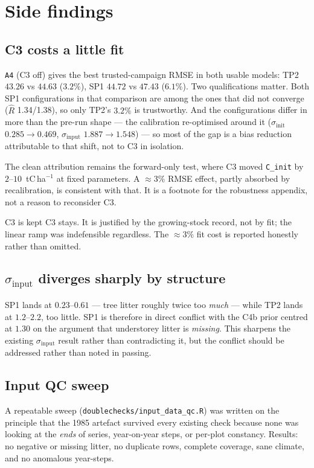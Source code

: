 \documentclass[11pt]{article}
\newcommand{\sinit}{\sigma_{\mathrm{init}}}
\newcommand{\sinput}{\sigma_{\mathrm{input}}}
\begin{document}
\section{Side findings}

\subsection{C3 costs a little fit}
\texttt{A4} (C3 off) gives the best trusted-campaign RMSE in both usable models: TP2 $43.26$ vs
$44.63$ ($3.2\%$), SP1 $44.72$ vs $47.43$ ($6.1\%$). Two qualifications matter. Both SP1
configurations in that comparison are among the ones that did not converge
($\hat{R}$ 1.34/1.38), so only TP2's $3.2\%$ is trustworthy. And the configurations differ in
more than the pre-run shape --- the calibration re-optimised around it ($\sinit$ $0.285
\rightarrow 0.469$, $\sinput$ $1.887 \rightarrow 1.548$) --- so most of the gap is a bias
reduction attributable to that shift, not to C3 in isolation.

The clean attribution remains the forward-only test, where C3 moved \texttt{C\_init} by
$2$--$10$~tC\,ha$^{-1}$ at fixed parameters. A $\approx 3\%$ RMSE effect, partly absorbed by
recalibration, is consistent with that. It is a footnote for the robustness appendix, not a
reason to reconsider C3.

\begin{decision}{C3 is kept}
C3 stays. It is justified by the growing-stock record, not by fit; the linear ramp was
indefensible regardless. The $\approx 3\%$ fit cost is reported honestly rather than omitted.
\end{decision}

\subsection{$\sinput$ diverges sharply by structure}
SP1 lands at $0.23$--$0.61$ --- tree litter roughly twice too \emph{much} --- while TP2 lands at
$1.2$--$2.2$, too little. SP1 is therefore in direct conflict with the C4b prior centred at
$1.30$ on the argument that understorey litter is \emph{missing}. This sharpens the existing
$\sinput$ result rather than contradicting it, but the conflict should be addressed rather than
noted in passing.

\subsection{Input QC sweep}
A repeatable sweep (\texttt{doublechecks/input\_data\_qc.R}) was written on the principle that
the 1985 artefact survived every existing check because none was looking at the \emph{ends} of
series, year-on-year steps, or per-plot constancy. Results: no negative or missing litter, no
duplicate rows, complete coverage, sane climate, and no anomalous year-steps.
\end{document}
